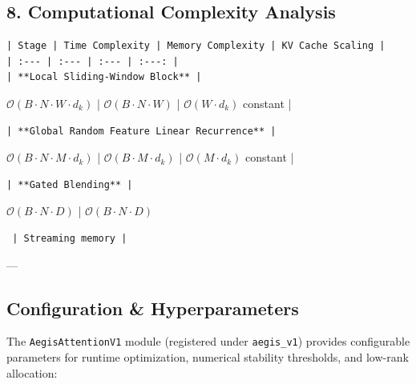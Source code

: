 \subsection{8. Computational Complexity Analysis}
\begin{verbatim}
| Stage | Time Complexity | Memory Complexity | KV Cache Scaling |
| :--- | :--- | :--- | :---: |
| **Local Sliding-Window Block** | 
\end{verbatim}$\mathcal{O}(B \cdot N \cdot W \cdot d_k)$ | $\mathcal{O}(B \cdot N \cdot W)$ | $\mathcal{O}(W \cdot d_k)$ constant |
\begin{verbatim}
| **Global Random Feature Linear Recurrence** | 
\end{verbatim}$\mathcal{O}(B \cdot N \cdot M \cdot d_k)$ | $\mathcal{O}(B \cdot M \cdot d_k)$ | $\mathcal{O}(M \cdot d_k)$ constant |
\begin{verbatim}
| **Gated Blending** | 
\end{verbatim}$\mathcal{O}(B \cdot N \cdot D)$ | $\mathcal{O}(B \cdot N \cdot D)$\begin{verbatim}
 | Streaming memory |
\end{verbatim}

---

\subsection{Configuration \& Hyperparameters}
The \texttt{AegisAttentionV1} module (registered under \texttt{aegis\_v1}) provides configurable parameters for runtime optimization, numerical stability thresholds, and low-rank allocation:

